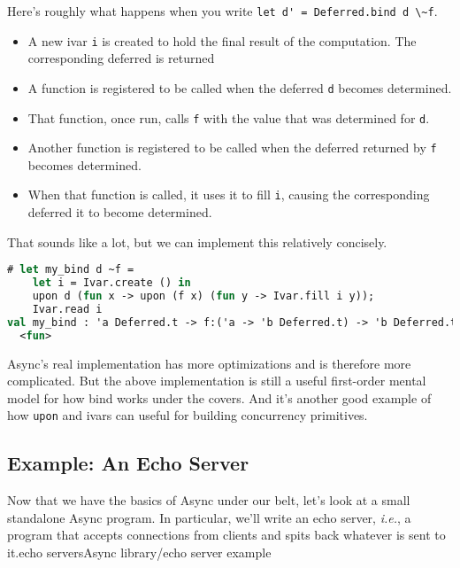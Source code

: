 Here's roughly what happens when you write
\passthrough{\lstinline!let d' = Deferred.bind d \~f!}.

\begin{itemize}
\item
  A new ivar \passthrough{\lstinline!i!} is created to hold the final
  result of the computation. The corresponding deferred is returned
\item
  A function is registered to be called when the deferred
  \passthrough{\lstinline!d!} becomes determined.
\item
  That function, once run, calls \passthrough{\lstinline!f!} with the
  value that was determined for \passthrough{\lstinline!d!}.
\item
  Another function is registered to be called when the deferred returned
  by \passthrough{\lstinline!f!} becomes determined.
\item
  When that function is called, it uses it to fill
  \passthrough{\lstinline!i!}, causing the corresponding deferred it to
  become determined.
\end{itemize}

That sounds like a lot, but we can implement this relatively concisely.

\begin{lstlisting}[language=Caml]
# let my_bind d ~f =
    let i = Ivar.create () in
    upon d (fun x -> upon (f x) (fun y -> Ivar.fill i y));
    Ivar.read i
val my_bind : 'a Deferred.t -> f:('a -> 'b Deferred.t) -> 'b Deferred.t =
  <fun>
\end{lstlisting}

Async's real implementation has more optimizations and is therefore more
complicated. But the above implementation is still a useful first-order
mental model for how bind works under the covers. And it's another good
example of how \passthrough{\lstinline!upon!} and ivars can useful for
building concurrency primitives.

\hypertarget{examples-an-echo-server}{%
\subsection{Example: An Echo Server}\label{examples-an-echo-server}}

Now that we have the basics of Async under our belt, let's look at a
small standalone Async program. In particular, we'll write an echo
server, \emph{i.e.}, a program that accepts connections from clients and
spits back whatever is sent to it.\protect\hypertarget{echo}{}{echo
servers}\protect\hypertarget{ALecho}{}{Async library/echo server
example}

